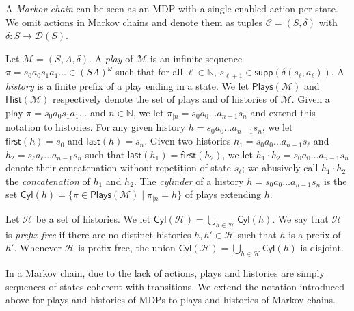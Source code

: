 \documentclass[a4paper,UKenglish,cleveref,autoref,thm-restate,colorlinks]{lipics-v2021}
\newcommand{\IN}{\mathbb{N}}
\newcommand{\dist}[1]{\mathcal{D}(#1)}
\newcommand{\cyl}[1]{\mathsf{Cyl}(#1)}
\newcommand{\supp}[1]{\mathsf{supp}(#1)}
\newcommand{\mdp}{\mathcal{M}}
\newcommand{\mdpStateSpace}{S}
\newcommand{\mdpState}{s}
\newcommand{\mdpActionSpace}{A}
\newcommand{\mdpAction}{a}
\newcommand{\mdpTrans}{\delta}
\newcommand{\mdpTuple}{(\mdpStateSpace, \mdpActionSpace, \mdpTrans)}
\newcommand{\playSet}[1]{\mathsf{Plays}(#1)}
\newcommand{\play}{\pi}
\newcommand{\playPrefix}[2]{#1_{|#2}}
\newcommand{\histSet}[1]{\mathsf{Hist}(#1)}
\newcommand{\histPart}{\mathcal{H}}
\newcommand{\hist}{h}
\newcommand{\histConcat}[2]{#1\cdot{}#2}
\newcommand{\last}[1]{\mathsf{last}(#1)}
\newcommand{\first}[1]{\mathsf{first}(#1)}
\newcommand{\indexPosition}{\ell}
\newcommand{\indexLast}{n}
\newcommand{\mchain}{\mathcal{C}}
\begin{document}
A \textit{Markov chain} can be seen as an MDP with a single enabled action per state.
We omit actions in Markov chains and denote them as tuples $\mchain = (\mdpStateSpace, \mdpTrans)$ with $\mdpTrans\colon\mdpStateSpace\to\dist{\mdpStateSpace}$.



Let $\mdp = \mdpTuple$.
A \textit{play} of $\mdp$ is an infinite sequence $\play=\mdpState_0\mdpAction_0\mdpState_1\mdpAction_1\ldots\in (\mdpStateSpace\mdpActionSpace)^\omega$ such that for all $\indexPosition\in\IN$, $\mdpState_{\indexPosition+1}\in \supp{\mdpTrans(\mdpState_\indexPosition, \mdpAction_\indexPosition)}$.
A \textit{history} is a finite prefix of a play ending in a state.
We let $\playSet{\mdp}$ and $\histSet{\mdp}$ respectively denote the set of plays and of histories of $\mdp$.
Given a play $\play=\mdpState_0\mdpAction_0\mdpState_1\mdpAction_1\ldots$ and $\indexLast\in\IN$, we let $\playPrefix{\play}{\indexLast} = \mdpState_0\mdpAction_0\ldots \mdpAction_{\indexLast-1}\mdpState_\indexLast$ and extend this notation to histories.
For any given history $\hist = \mdpState_0\mdpAction_0\ldots \mdpAction_{\indexLast-1}\mdpState_\indexLast$, we let $\first{\hist} = \mdpState_0$ and $\last{\hist} = \mdpState_\indexLast$.
Given two histories $\hist_1 = \mdpState_0\mdpAction_0\ldots \mdpAction_{\indexLast-1}\mdpState_\indexPosition$ and $\hist_2 = \mdpState_\indexPosition\mdpAction_\indexPosition\ldots \mdpAction_{\indexLast-1}\mdpState_\indexLast$ such that $\last{\hist_1} = \first{\hist_2}$, we let $\histConcat{\hist_1}{\hist_2} = \mdpState_0\mdpAction_0\ldots\mdpAction_{\indexLast-1}\mdpState_\indexLast$ denote their concatenation without repetition of state $\mdpState_\indexPosition$; we abusively call $\histConcat{\hist_1}{\hist_2}$ the \textit{concatenation} of $\hist_1$ and $\hist_2$.
The \textit{cylinder} of a history $\hist = \mdpState_0\mdpAction_0\ldots\mdpAction_{\indexLast-1}\mdpState_\indexLast$ is the set $\cyl{\hist} = \{\play\in\playSet{\mdp}\mid\playPrefix{\play}{\indexLast}=\hist\}$ of plays extending $\hist$.

Let $\histPart$ be a set of histories.
We let $\cyl{\histPart}=\bigcup_{\hist\in\histPart}\cyl{\hist}$.
We say that $\histPart$ is \textit{prefix-free} if there are no distinct histories $\hist,\hist'\in\histPart$ such that $\hist$ is a prefix of $\hist'$.
Whenever $\histPart$ is prefix-free, the union $\cyl{\histPart}=\bigcup_{\hist\in\histPart}\cyl{\hist}$ is disjoint.

In a Markov chain, due to the lack of actions, plays and histories are simply sequences of states coherent with transitions.
We extend the notation introduced above for plays and histories of MDPs to plays and histories of Markov chains.
\end{document}
